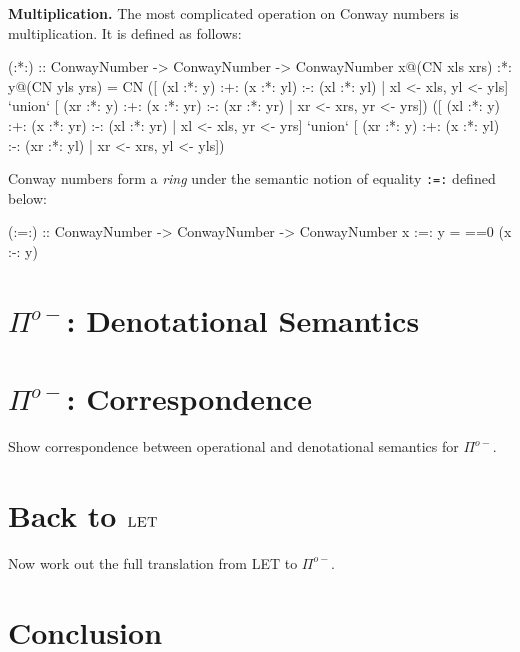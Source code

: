\documentclass[authoryear,preprint]{sigplanconf}
\begin{document}
\smallskip\noindent\textbf{Multiplication.} The most complicated operation on
Conway numbers is multiplication. It is defined as follows:
\begin{code}
(:*:) :: ConwayNumber -> ConwayNumber -> ConwayNumber
x@(CN xls xrs) :*: y@(CN yls yrs) = 
  CN 
    ([ (xl :*: y) :+: (x :*: yl) :-: (xl :*: yl)
     | xl <- xls, yl <- yls] `union`
     [ (xr :*: y) :+: (x :*: yr) :-: (xr :*: yr)
     | xr <- xrs, yr <- yrs])
    ([ (xl :*: y) :+: (x :*: yr) :-: (xl :*: yr)
     | xl <- xls, yr <- yrs] `union`
     [ (xr :*: y) :+: (x :*: yl) :-: (xr :*: yl)
     | xr <- xrs, yl <- yls])
\end{code}

Conway numbers form a \emph{ring} under the semantic notion of equality
\lstinline$:=:$ defined below:
\begin{code}
(:=:) :: ConwayNumber -> ConwayNumber -> ConwayNumber
x :=: y = ==0 (x :-: y)
\end{code}

\section{$\Pi^{o-}$: Denotational Semantics} 

\section{$\Pi^{o-}$: Correspondence} 

Show correspondence between operational and denotational semantics for
$\Pi^{o-}$.

\section{Back to $\textsc{LET}$}

Now work out the full translation from \textsc{LET} to $\Pi^{o-}$.

\section{Conclusion}


\softraggedright

\end{document}
